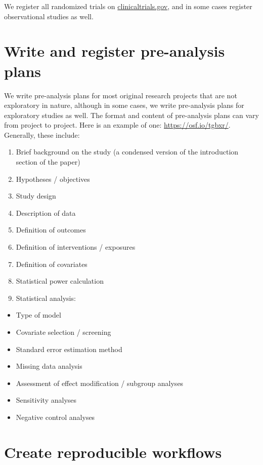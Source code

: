 \documentclass[
]{book}
\providecommand{\tightlist}{%
  \setlength{\itemsep}{0pt}\setlength{\parskip}{0pt}}
\begin{document}
We register all randomized trials on \url{clinicaltrials.gov}, and in some cases register observational studies as well.

\section{Write and register pre-analysis plans}\label{write-and-register-pre-analysis-plans}

We write pre-analysis plans for most original research projects that are not exploratory in nature, although in some cases, we write pre-analysis plans for exploratory studies as well. The format and content of pre-analysis plans can vary from project to project. Here is an example of one: \url{https://osf.io/tgbxr/}. Generally, these include:

\begin{enumerate}
\def\labelenumi{\arabic{enumi}.}
\tightlist
\item
  Brief background on the study (a condensed version of the introduction section of the paper)
\item
  Hypotheses / objectives
\item
  Study design
\item
  Description of data
\item
  Definition of outcomes
\item
  Definition of interventions / exposures
\item
  Definition of covariates
\item
  Statistical power calculation
\item
  Statistical analysis:
\end{enumerate}

\begin{itemize}
\tightlist
\item
  Type of model
\item
  Covariate selection / screening
\item
  Standard error estimation method
\item
  Missing data analysis
\item
  Assessment of effect modification / subgroup analyses
\item
  Sensitivity analyses
\item
  Negative control analyses
\end{itemize}

\section{Create reproducible workflows}\label{create-reproducible-workflows}
\end{document}
